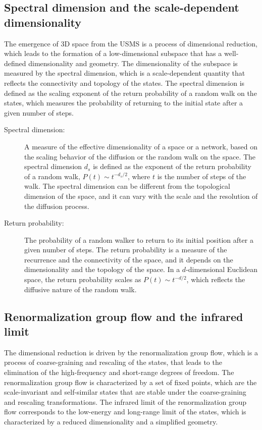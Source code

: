 \subsection{Spectral dimension and the scale-dependent dimensionality}
The emergence of 3D space from the USMS is a process of dimensional reduction, which leads to the formation of a low-dimensional subspace that has a well-defined dimensionality and geometry. The dimensionality of the subspace is measured by the spectral dimension, which is a scale-dependent quantity that reflects the connectivity and topology of the states. The spectral dimension is defined as the scaling exponent of the return probability of a random walk on the states, which measures the probability of returning to the initial state after a given number of steps.

\begin{tcolorbox}[colback=blue!5!white,colframe=blue!75!black,title=New terms]
\begin{description}
\item[Spectral dimension:] A measure of the effective dimensionality of a space or a network, based on the scaling behavior of the diffusion or the random walk on the space. The spectral dimension $d_s$ is defined as the exponent of the return probability of a random walk, $P(t) \sim t^{-d_s/2}$, where $t$ is the number of steps of the walk. The spectral dimension can be different from the topological dimension of the space, and it can vary with the scale and the resolution of the diffusion process.
\item[Return probability:] The probability of a random walker to return to its initial position after a given number of steps. The return probability is a measure of the recurrence and the connectivity of the space, and it depends on the dimensionality and the topology of the space. In a $d$-dimensional Euclidean space, the return probability scales as $P(t) \sim t^{-d/2}$, which reflects the diffusive nature of the random walk.
\end{description}
\end{tcolorbox}

\subsection{Renormalization group flow and the infrared limit}
The dimensional reduction is driven by the renormalization group flow, which is a process of coarse-graining and rescaling of the states, that leads to the elimination of the high-frequency and short-range degrees of freedom. The renormalization group flow is characterized by a set of fixed points, which are the scale-invariant and self-similar states that are stable under the coarse-graining and rescaling transformations. The infrared limit of the renormalization group flow corresponds to the low-energy and long-range limit of the states, which is characterized by a reduced dimensionality and a simplified geometry.

